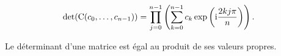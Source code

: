 
\begin{corol}
    $$\det(\mathrm{C}(c_0, \dots, c_{n-1})) = \prod_{j=0}^{n-1} \left( \sum_{k=0}^{n-1} c_k \exp \left( \mathrm{i} \frac{2kj \pi}{n} \right) \right).$$
\end{corol}

\begin{preuve}
    Le déterminant d'une matrice est égal au produit de ses valeurs propres.
\end{preuve}
